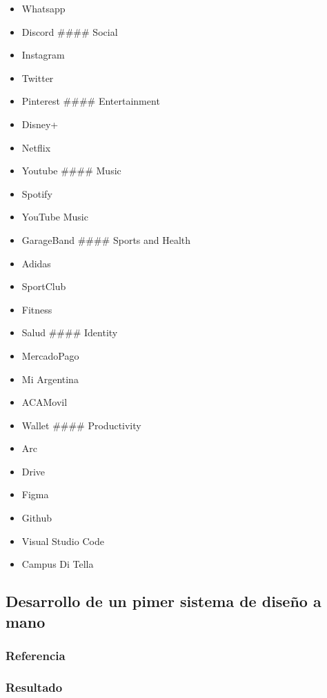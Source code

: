 \documentclass[
]{article}
\providecommand{\tightlist}{%
  \setlength{\itemsep}{0pt}\setlength{\parskip}{0pt}}
\begin{document}
\begin{itemize}
\tightlist
\item
  Whatsapp
\item
  Discord \#\#\#\# Social
\item
  Instagram
\item
  Twitter
\item
  Pinterest \#\#\#\# Entertainment
\item
  Disney+
\item
  Netflix
\item
  Youtube \#\#\#\# Music
\item
  Spotify
\item
  YouTube Music
\item
  GarageBand \#\#\#\# Sports and Health
\item
  Adidas
\item
  SportClub
\item
  Fitness
\item
  Salud \#\#\#\# Identity
\item
  MercadoPago
\item
  Mi Argentina
\item
  ACAMovil
\item
  Wallet \#\#\#\# Productivity
\item
  Arc
\item
  Drive
\item
  Figma
\item
  Github
\item
  Visual Studio Code
\item
  Campus Di Tella
\end{itemize}

\hypertarget{desarrollo-de-un-pimer-sistema-de-diseuxf1o-a-mano}{%
\subsection{Desarrollo de un pimer sistema de diseño a
mano}\label{desarrollo-de-un-pimer-sistema-de-diseuxf1o-a-mano}}

\hypertarget{referencia}{%
\subsubsection{Referencia}\label{referencia}}

\hypertarget{resultado}{%
\subsubsection{Resultado}\label{resultado}}
\end{document}
